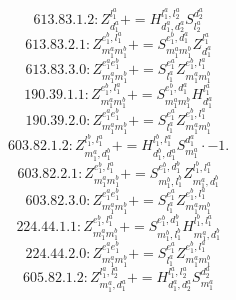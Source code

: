 \documentclass[letterpaper,10pt,fleqn,leqno,onecolumn]{article}
\begin{document}
\begin{equation} \;\;\;\;\;\;  613.83.1.2: Z^{l_{1}^{a}}_{d_{1}^{a}}+=H^{l_{1}^{a},l_{2}^{a}}_{d_{1}^{a},d_{2}^{a}}S^{d_{2}^{a}}_{l_{2}^{a}} \end{equation}
\begin{equation} \;\;\;\;\;\;  613.83.2.1: Z^{e_{1}^{b},l_{1}^{a}}_{m_{1}^{a}m_{1}^{b}}+=S^{e_{1}^{b},d_{1}^{a}}_{m_{1}^{a}m_{1}^{b}}Z^{l_{1}^{a}}_{d_{1}^{a}} \end{equation}
\begin{equation} \;\;\;\;\;\;  613.83.3.0: Z^{e_{1}^{a}e_{1}^{b}}_{m_{1}^{a}m_{1}^{b}}+=S^{e_{1}^{a}}_{l_{1}^{a}}Z^{e_{1}^{b},l_{1}^{a}}_{m_{1}^{a}m_{1}^{b}} \end{equation}
\begin{equation} \;\;\;\;\;\;  190.39.1.1: Z^{e_{1}^{b},l_{1}^{a}}_{m_{1}^{a}m_{1}^{b}}+=S^{e_{1}^{b},d_{1}^{a}}_{m_{1}^{a}m_{1}^{b}}H^{l_{1}^{a}}_{d_{1}^{a}} \end{equation}
\begin{equation} \;\;\;\;\;\;  190.39.2.0: Z^{e_{1}^{a}e_{1}^{b}}_{m_{1}^{a}m_{1}^{b}}+=S^{e_{1}^{a}}_{l_{1}^{a}}Z^{e_{1}^{b},l_{1}^{a}}_{m_{1}^{a}m_{1}^{b}} \end{equation}
\begin{equation} \;\;\;\;\;\;  603.82.1.2: Z^{l_{1}^{b},l_{1}^{a}}_{m_{1}^{a},d_{1}^{b}}+=H^{l_{1}^{b},l_{1}^{a}}_{d_{1}^{b},d_{1}^{a}}S^{d_{1}^{a}}_{m_{1}^{a}}\cdot -1. \end{equation}
\begin{equation} \;\;\;\;\;\;  603.82.2.1: Z^{e_{1}^{b},l_{1}^{a}}_{m_{1}^{a}m_{1}^{b}}+=S^{e_{1}^{b},d_{1}^{b}}_{m_{1}^{b},l_{1}^{b}}Z^{l_{1}^{b},l_{1}^{a}}_{m_{1}^{a},d_{1}^{b}} \end{equation}
\begin{equation} \;\;\;\;\;\;  603.82.3.0: Z^{e_{1}^{a}e_{1}^{b}}_{m_{1}^{a}m_{1}^{b}}+=S^{e_{1}^{a}}_{l_{1}^{a}}Z^{e_{1}^{b},l_{1}^{a}}_{m_{1}^{a}m_{1}^{b}} \end{equation}
\begin{equation} \;\;\;\;\;\;  224.44.1.1: Z^{e_{1}^{b},l_{1}^{a}}_{m_{1}^{a}m_{1}^{b}}+=S^{e_{1}^{b},d_{1}^{b}}_{m_{1}^{b},l_{1}^{b}}H^{l_{1}^{b},l_{1}^{a}}_{m_{1}^{a},d_{1}^{b}} \end{equation}
\begin{equation} \;\;\;\;\;\;  224.44.2.0: Z^{e_{1}^{a}e_{1}^{b}}_{m_{1}^{a}m_{1}^{b}}+=S^{e_{1}^{a}}_{l_{1}^{a}}Z^{e_{1}^{b},l_{1}^{a}}_{m_{1}^{a}m_{1}^{b}} \end{equation}
\begin{equation} \;\;\;\;\;\;  605.82.1.2: Z^{l_{1}^{a},l_{2}^{a}}_{m_{1}^{a},d_{1}^{a}}+=H^{l_{1}^{a},l_{2}^{a}}_{d_{1}^{a},d_{2}^{a}}S^{d_{2}^{a}}_{m_{1}^{a}} \end{equation}
\end{document}

